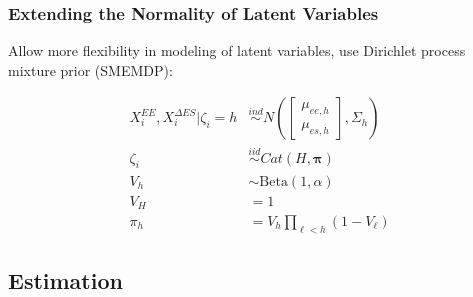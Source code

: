 \documentclass[handout]{beamer}\usepackage[]{graphicx}\usepackage[]{color}
\begin{document}
\begin{frame}
\frametitle{Extending the Normality of Latent Variables}
Allow more flexibility in modeling of latent variables, use Dirichlet process mixture prior (SMEMDP):

\begin{align*}
X_i^{EE},X_i^{\Delta ES}|\zeta_i=h &\overset{ind}{\sim}  N\left( 
  \begin{bmatrix}
  \mu_{ee,h} \\
  \mu_{es,h} 
  \end{bmatrix}
  ,
  \Sigma_{h}
    \right) \\
    \zeta_i &\overset{iid}{\sim} Cat(H,\boldsymbol{\pi}) \\
    V_h &\sim \text{Beta}(1,\alpha) \\
    V_H & = 1 \\
    \pi_h &= V_h \prod_{\ell < h} (1-V_{\ell}) 
\end{align*}

\end{frame}


\subsection{Estimation}


% 
% 
% 
\end{document}
